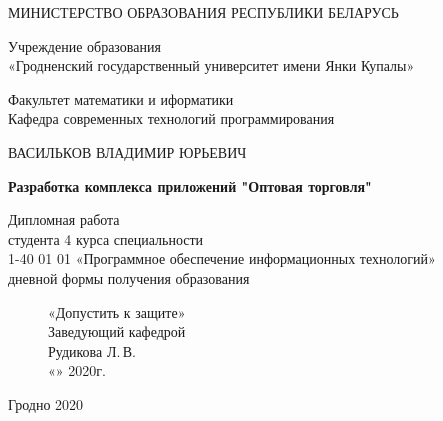 \begin{titlepage}
    \begin{center}
        МИНИСТЕРСТВО ОБРАЗОВАНИЯ РЕСПУБЛИКИ БЕЛАРУСЬ

        \vspace{0.5cm}

        Учреждение образования \\
        «Гродненский государственный университет имени Янки Купалы»
        \vspace{0.5cm}

        Факультет математики и иформатики \\
        Кафедра современных технологий программирования

        \vfill

        ВАСИЛЬКОВ ВЛАДИМИР ЮРЬЕВИЧ
        \vfill

        {\large\textbf{
            Разработка комплекса приложений "Оптовая торговля"
        }}

        \vfill

        Дипломная работа \\
        студента 4 курса специальности\\
        1-40 01 01 «Программное обеспечение информационных технологий»\\
        дневной формы получения образования

        \bigskip
    \end{center}
    \vfill

    \newlength{\ML}
    \begin{figure}[!htb]
        \centering
        \begin{minipage}{.5\textwidth}
            «Допустить к защите»\\
            Заведующий кафедрой\\
            \underline{\hspace{\ML}} Рудикова Л.\,В.\\
            «\underline{\hspace{0.7cm}}» \underline{\hspace{2cm}} 2020г.
        \end{minipage}%
        \begin{minipage}[c]{0.5\textwidth}
        \end{minipage}%
    \end{figure}

    \vfill

    \begin{center}
        Гродно 2020
    \end{center}
\end{titlepage}